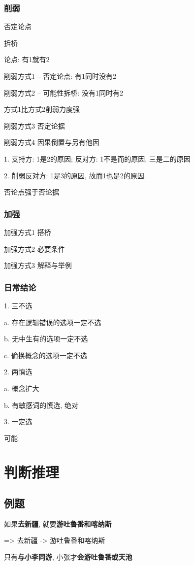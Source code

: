 \subsubsection{削弱}
否定论点

拆桥

论点: 有1就有2

削弱方式1 -- 否定论点: 有1同时没有2

削弱方式2 -- 可能性拆桥: 没有1同时有2

方式1比方式2削弱力度强

削弱方式3 否定论据

削弱方式4  因果倒置与另有他因

1. 支持方: 1是2的原因; 反对方: 1不是而的原因, 三是二的原因

2. 削弱反对方: 1是3的原因, 故而1也是2的原因.

否论点强于否论据


\subsubsection{加强}

加强方式1  搭桥

加强方式2 必要条件

加强方式3 解释与举例

\subsubsection{日常结论}
1. 三不选

a. 存在逻辑错误的选项一定不选

b. 无中生有的选项一定不选

c. 偷换概念的选项一定不选

2. 两慎选

a. 概念扩大

b. 有敏感词的慎选, 绝对

3. 一定选

可能

\section{判断推理}

\subsection{例题}
如果\textbf{去新疆}, 就要\textbf{游吐鲁番和喀纳斯}

=> 去新疆 -> 游吐鲁番和喀纳斯

只有\textbf{与小李同游}, 小张才\textbf{会游吐鲁番或天池}

